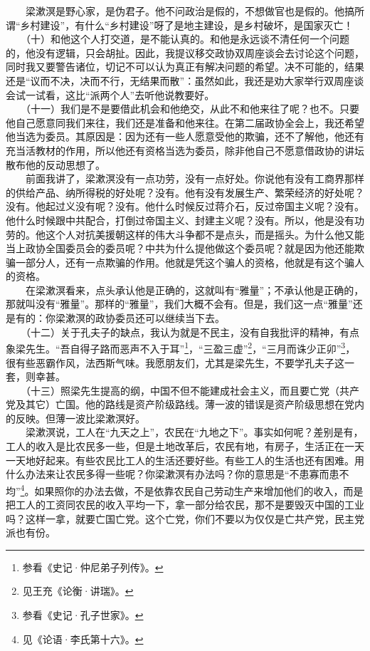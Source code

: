 \documentclass[cn,11pt,chinese]{elegantbook}
\begin{document}
　　梁漱溟是野心家，是伪君子。他不问政治是假的，不想做官也是假的。他搞所谓“乡村建设”，有什么“乡村建设”呀了是地主建设，是乡村破坏，是国家灭亡！\\
　　（十）和他这个人打交道，是不能认真的。和他是永远谈不清任何一个问题的，他没有逻辑，只会胡扯。因此，我提议移交政协双周座谈会去讨论这个问题，同时我又要警告诸位，切记不可以认为真正有解决问题的希望。决不可能的，结果还是“议而不决，决而不行，无结果而散”：虽然如此，我还是劝大家举行双周座谈会试一试看，这比“派两个人”去听他说教要好。\\
　　（十一）我们是不是要借此机会和他绝交，从此不和他来往了呢？也不。只要他自己愿意同我们来往，我们还是准备和他来往。在第二届政协全会上，我还希望他当选为委员。其原因是：因为还有一些人愿意受他的欺骗，还不了解他，他还有充当活教材的作用，所以他还有资格当选为委员，除非他自己不愿意借政协的讲坛散布他的反动思想了。\\
　　前面我讲了，梁漱溟没有一点功劳，没有一点好处。你说他有没有工商界那样的供给产品、纳所得税的好处呢？没有。他有没有发展生产、繁荣经济的好处呢？没有。他起过义没有呢？没有。他什么时候反过蒋介石，反过帝国主义呢？没有。他什么时候跟中共配合，打倒过帝国主义、封建主义呢？没有。所以，他是没有功劳的。他这个人对抗美援朝这样的伟大斗争都不是点头，而是摇头。为什么他又能当上政协全国委员会的委员呢？中共为什么提他做这个委员呢？就是因为他还能欺骗一部分人，还有一点欺骗的作用。他就是凭这个骗人的资格，他就是有这个骗人的资格。\\
　　在梁漱溟看来，点头承认他是正确的，这就叫有“雅量”；不承认他是正确的，那就叫没有“雅量”。那样的“雅量”，我们大概不会有。但是，我们这一点“雅量”还是有的：你梁漱溟的政协委员还可以继续当下去。\\
　　（十二）关于孔夫子的缺点，我认为就是不民主，没有自我批评的精神，有点象梁先生。“吾自得子路而恶声不入于耳”\footnote[3]{ 参看《史记·仲尼弟子列传》。}，“三盈三虚”\footnote[4]{ 见王充《论衡·讲瑞》。}，“三月而诛少正卯”\footnote[5]{ 参看《史记·孔子世家》。}，很有些恶霸作风，法西斯气味。我愿朋友们，尤其是梁先生，不要学孔夫子这一套，则幸甚。\\
　　（十三）照梁先生提高的纲，中国不但不能建成社会主义，而且要亡党（共产党及其它）亡国。他的路线是资产阶级路线。薄一波的错误是资产阶级思想在党内的反映。但薄一波比梁漱溟好。\\
　　梁漱溟说，工人在“九天之上”，农民在“九地之下”。事实如何呢？差别是有，工人的收入是比农民多一些，但是土地改革后，农民有地，有房子，生活正在一天一天地好起来。有些农民比工人的生活还要好些。有些工人的生活也还有困难。用什么办法来让农民多得一些呢？你梁漱溟有办法吗？你的意思是“不患寡而患不均”\footnote[6]{ 见《论语·李氏第十六》。}。如果照你的办法去做，不是依靠农民自己劳动生产来增加他们的收入，而是把工人的工资同农民的收入平均一下，拿一部分给农民，那不是要毁灭中国的工业吗？这样一拿，就要亡国亡党。这个亡党，你们不要以为仅仅是亡共产党，民主党派也有份。\\
\end{document}
